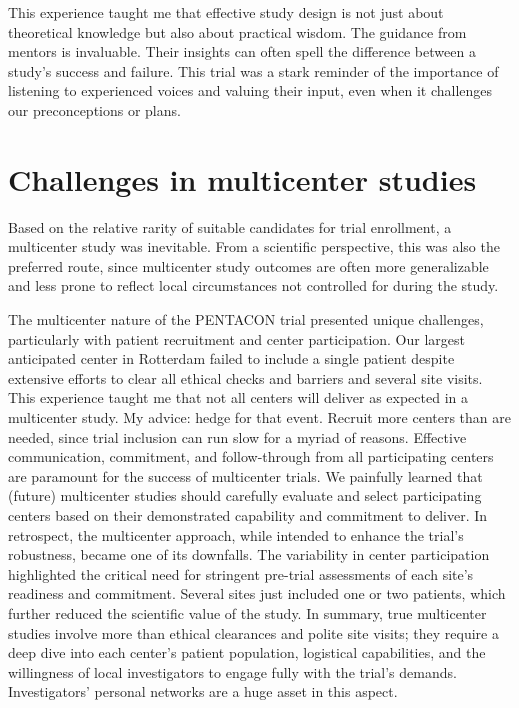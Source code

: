 \documentclass[authordate, reflection,issue]{jote-new-article}
\begin{document}
	This experience taught me that effective study design is not just about theoretical knowledge but also about practical wisdom. The guidance from mentors is invaluable. Their insights can often spell the difference between a study's success and failure. This trial was a stark reminder of the importance of listening to experienced voices and valuing their input, even when it challenges our preconceptions or plans.



	\section{Challenges in multicenter studies}



	Based on the relative rarity of suitable candidates for trial enrollment, a multicenter study was inevitable. From a scientific perspective, this was also the preferred route, since multicenter study outcomes are often more generalizable and less prone to reflect local circumstances not controlled for during the study.



	The multicenter nature of the PENTACON trial presented unique challenges, particularly with patient recruitment and center participation. Our largest anticipated center in Rotterdam failed to include a single patient despite extensive efforts to clear all ethical checks and barriers and several site visits. This experience taught me that not all centers will deliver as expected in a multicenter study. My advice: hedge for that event. Recruit more centers than are needed, since trial inclusion can run slow for a myriad of reasons. Effective communication, commitment, and follow-through from all participating centers are paramount for the success of multicenter trials. We painfully learned that (future) multicenter studies should carefully evaluate and select participating centers based on their demonstrated capability and commitment to deliver. In retrospect, the multicenter approach, while intended to enhance the trial's robustness, became one of its downfalls. The variability in center participation highlighted the critical need for stringent pre-trial assessments of each site's readiness and commitment. Several sites just included one or two patients, which further reduced the scientific value of the study. In summary, true multicenter studies involve more than ethical clearances and polite site visits; they require a deep dive into each center's patient population, logistical capabilities, and the willingness of local investigators to engage fully with the trial's demands. Investigators' personal networks are a huge asset in this aspect.
\end{document}
